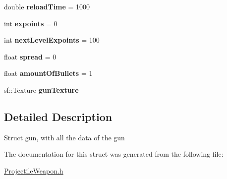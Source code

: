 \begin{DoxyCompactItemize}
\item 
\hypertarget{structgun_a3da09a6a5145b2069a875f3435b2c078}{}double {\bfseries reload\+Time} = 1000\label{structgun_a3da09a6a5145b2069a875f3435b2c078}

\item 
\hypertarget{structgun_a6bdea0fdde7e0a050351d6e44a8de1a1}{}int {\bfseries expoints} = 0\label{structgun_a6bdea0fdde7e0a050351d6e44a8de1a1}

\item 
\hypertarget{structgun_a2a1b171cf5ef4b38fa858d31ec5be81b}{}int {\bfseries next\+Level\+Expoints} = 100\label{structgun_a2a1b171cf5ef4b38fa858d31ec5be81b}

\item 
\hypertarget{structgun_adf8ff55ef870edfb078d1de50f69943d}{}float {\bfseries spread} = 0\label{structgun_adf8ff55ef870edfb078d1de50f69943d}

\item 
\hypertarget{structgun_a3333b3fb0ad442342dd210734f9d2fa7}{}float {\bfseries amount\+Of\+Bullets} = 1\label{structgun_a3333b3fb0ad442342dd210734f9d2fa7}

\item 
\hypertarget{structgun_ae6b9c66a5d53f50fea8b29a565528cfe}{}sf\+::\+Texture {\bfseries gun\+Texture}\label{structgun_ae6b9c66a5d53f50fea8b29a565528cfe}

\end{DoxyCompactItemize}


\subsection{Detailed Description}
Struct gun, with all the data of the gun 

The documentation for this struct was generated from the following file\+:\begin{DoxyCompactItemize}
\item 
\hyperlink{_projectile_weapon_8h}{Projectile\+Weapon.\+h}\end{DoxyCompactItemize}
